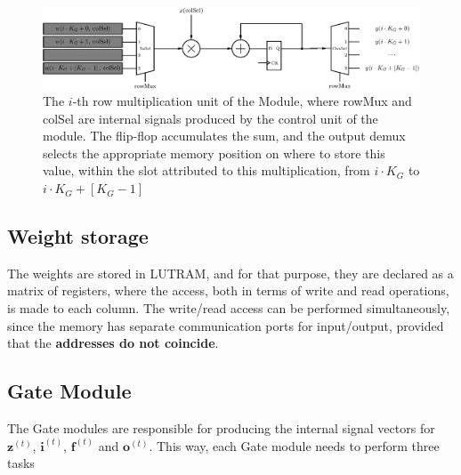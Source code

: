 \documentclass[conference]{IEEEtran}
\newcommand{\mb}[1]{\mathbf{#1}}
\begin{document}
\begin{figure}[!t]
    \centering
    \includegraphics[width=\linewidth]{figures/array-prod.eps}
    \caption{The $i$-th row multiplication unit of the Module, where rowMux and colSel are internal signals produced by the control unit of the module. The flip-flop accumulates the sum, and the output demux selects the appropriate memory position on where to store this value, within the slot attributed to this multiplication, from $i\cdot K_G$ to $i\cdot K_G + \left[K_G-1\right]$}
    \label{fig:array-prod}
\end{figure}

\subsection{Weight storage}\label{sec:proprarch_ram}
The weights are stored in LUTRAM, and for that purpose, they are declared as a matrix of registers, where the access, both in terms
of write and read operations, is made to each column. The write/read access can be performed simultaneously, since the memory has
separate communication ports for input/output, provided that the \textbf{addresses do not coincide}.

\subsection{Gate Module}\label{sec:proparch_gate}
The Gate modules are responsible for producing the internal signal vectors for $\mb{z}^{(t)}$, $\mb{i}^{(t)}$, $\mb{f}^{(t)}$ and $\mb{o}^{(t)}$. This way,
each Gate module needs to perform three tasks
\end{document}
